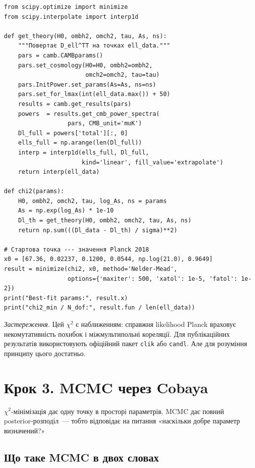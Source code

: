 \begin{verbatim}
from scipy.optimize import minimize
from scipy.interpolate import interp1d

def get_theory(H0, ombh2, omch2, tau, As, ns):
    """Повертає D_ell^TT на точках ell_data."""
    pars = camb.CAMBparams()
    pars.set_cosmology(H0=H0, ombh2=ombh2,
                       omch2=omch2, tau=tau)
    pars.InitPower.set_params(As=As, ns=ns)
    pars.set_for_lmax(int(ell_data.max()) + 50)
    results = camb.get_results(pars)
    powers  = results.get_cmb_power_spectra(
                  pars, CMB_unit='muK')
    Dl_full = powers['total'][:, 0]
    ells_full = np.arange(len(Dl_full))
    interp = interp1d(ells_full, Dl_full,
                      kind='linear', fill_value='extrapolate')
    return interp(ell_data)

def chi2(params):
    H0, ombh2, omch2, tau, log_As, ns = params
    As = np.exp(log_As) * 1e-10
    Dl_th = get_theory(H0, ombh2, omch2, tau, As, ns)
    return np.sum(((Dl_data - Dl_th) / sigma)**2)

# Стартова точка --- значення Planck 2018
x0 = [67.36, 0.02237, 0.1200, 0.0544, np.log(21.0), 0.9649]
result = minimize(chi2, x0, method='Nelder-Mead',
                  options={'maxiter': 500, 'xatol': 1e-5, 'fatol': 1e-2})
print("Best-fit params:", result.x)
print("chi2_min / N_dof:", result.fun / len(ell_data))
\end{verbatim}

\noindent
\textit{Застереження.} Цей $\chi^2$ є наближенням: справжня
likelihood Planck враховує некомутативність похибок і
міжмультипольні кореляції. Для публікаційних результатів
використовують офіційний пакет \texttt{clik} або
\texttt{candl}. Але для розуміння принципу цього достатньо.

\section{Крок 3. MCMC через Cobaya}

$\chi^2$-мінімізація дає одну точку в просторі параметрів.
MCMC дає повний posterior-розподіл~--- тобто відповідає
на питання «наскільки добре параметр визначений?»

\subsection{Що таке MCMC в двох словах}

